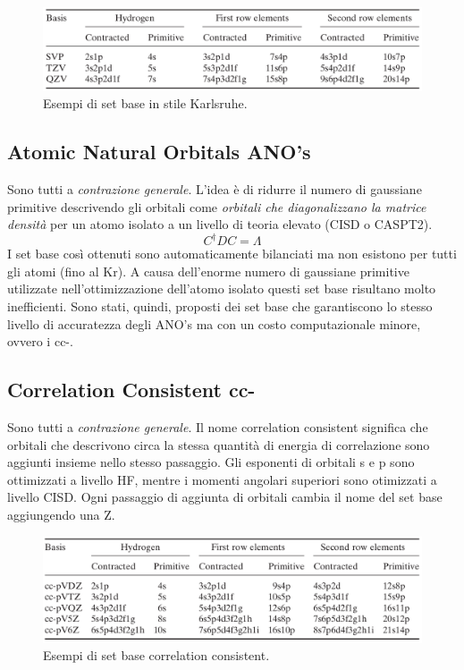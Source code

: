 \documentclass[oneside]{amsbook}
\numberwithin{section}{chapter}
\numberwithin{equation}{section}
\numberwithin{figure}{section}
\begin{document}
\begin{figure}[H]
\centering
\caption{Esempi di set base in stile Karlsruhe.}\label{popoppppo}
\includegraphics[scale=0.3]{kar}
\end{figure}


\subsection{Atomic Natural Orbitals ANO's }
Sono tutti a \emph{contrazione generale}. L'idea è di ridurre il numero di gaussiane primitive descrivendo gli orbitali come \emph{orbitali che diagonalizzano la matrice densità  } per un atomo isolato a un livello di teoria elevato (CISD o CASPT2). $$C^\dagger DC=\Lambda$$ I set base così ottenuti sono automaticamente bilanciati ma non esistono per tutti gli atomi (fino al Kr). A causa dell'enorme numero di gaussiane primitive utilizzate nell'ottimizzazione dell'atomo isolato questi set base risultano  molto inefficienti. Sono stati, quindi, proposti dei set base che garantiscono lo stesso livello di accuratezza degli ANO's ma con un costo computazionale minore, ovvero i cc-.

\subsection{Correlation Consistent cc-}
Sono tutti a \emph{contrazione generale}. Il nome correlation consistent significa che orbitali che descrivono circa la stessa quantità di energia di correlazione sono aggiunti insieme nello stesso passaggio. Gli esponenti di orbitali s e p sono ottimizzati a livello HF, mentre i momenti angolari superiori sono otimizzati a livello CISD. Ogni passaggio di aggiunta di orbitali cambia il nome del set base aggiungendo una Z.

\begin{figure}[H]
\centering
\caption{Esempi di set base correlation consistent.}\label{poccpopo}
\includegraphics[scale=0.3]{cc}
\end{figure}
\end{document}
